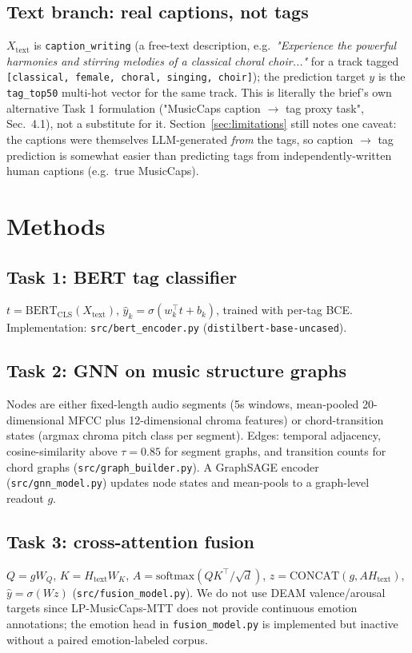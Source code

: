 \documentclass{article}
\begin{document}
\subsection{Text branch: real captions, not tags}
\label{sec:text-decision}

$X_{\text{text}}$ is \texttt{caption\_writing} (a free-text description,
e.g.\ \emph{"Experience the powerful harmonies and stirring melodies of a
classical choral choir..."} for a track tagged \texttt{[classical, female,
choral, singing, choir]}); the prediction target $y$ is the \texttt{tag\_top50}
multi-hot vector for the same track. This is literally the brief's own
alternative Task 1 formulation ("MusicCaps caption $\to$ tag proxy task",
Sec.~4.1), not a substitute for it. Section~\ref{sec:limitations} still
notes one caveat: the captions were themselves LLM-generated \emph{from}
the tags, so caption $\to$ tag prediction is somewhat easier than predicting
tags from independently-written human captions (e.g.\ true MusicCaps).

\section{Methods}
\label{sec:methods}

\subsection{Task 1: BERT tag classifier}
$t = \mathrm{BERT}_{\text{CLS}}(X_{\text{text}})$, $\hat{y}_k = \sigma(w_k^\top t + b_k)$,
trained with per-tag BCE. Implementation: \texttt{src/bert\_encoder.py}
(\texttt{distilbert-base-uncased}).

\subsection{Task 2: GNN on music structure graphs}
Nodes are either fixed-length audio segments (5s windows, mean-pooled
20-dimensional MFCC plus 12-dimensional chroma features) or chord-transition states (argmax chroma pitch class per
segment). Edges: temporal adjacency, cosine-similarity above
$\tau=0.85$ for segment graphs, and transition counts for chord graphs
(\texttt{src/graph\_builder.py}). A GraphSAGE encoder
(\texttt{src/gnn\_model.py}) updates node states and mean-pools to a
graph-level readout $g$.

\subsection{Task 3: cross-attention fusion}
$Q = gW_Q$, $K = H_{\text{text}}W_K$, $A = \mathrm{softmax}(QK^\top/\sqrt{d})$,
$z = \mathrm{CONCAT}(g, AH_{\text{text}})$, $\hat{y}=\sigma(Wz)$
(\texttt{src/fusion\_model.py}). We do not use DEAM valence/arousal targets
since LP-MusicCaps-MTT does not provide continuous emotion annotations; the
emotion head in \texttt{fusion\_model.py} is implemented but inactive
without a paired emotion-labeled corpus.
\end{document}
